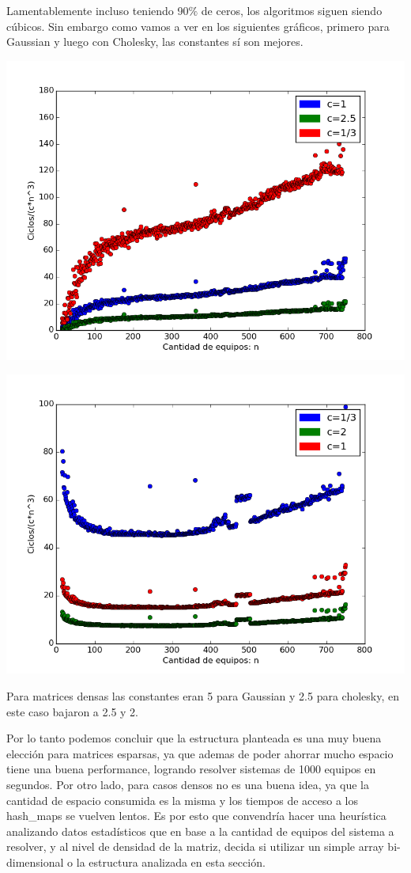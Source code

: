Lamentablemente incluso teniendo 90$\%$ de ceros, los algoritmos siguen siendo cúbicos. Sin embargo como vamos a ver en los siguientes gráficos, primero para Gaussian y luego con Cholesky, las constantes sí son mejores.

\includegraphics[scale=0.7]{img/constantefixedgaussian.png}
  
\includegraphics[scale=0.7]{img/constantefixedcholesky.png}

Para matrices densas las constantes eran 5 para Gaussian y 2.5 para cholesky, en este caso bajaron a 2.5 y 2.

Por lo tanto podemos concluir que la estructura planteada es una muy buena elección para matrices esparsas, ya que ademas de poder ahorrar mucho espacio tiene una buena performance, logrando resolver sistemas de 1000 equipos en segundos. Por otro lado, para casos densos no es una buena idea, ya que la cantidad de espacio consumida es la misma y los tiempos de acceso a los hash_maps se vuelven lentos. Es por esto que convendría hacer una heurística analizando datos estadísticos que en base a la cantidad de equipos del sistema a resolver, y al nivel de densidad de la matriz, decida si utilizar un simple array bi-dimensional o la estructura analizada en esta sección.

